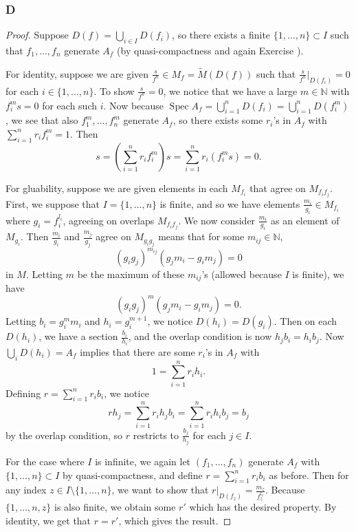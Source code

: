 \documentclass{article}
\newcommand{\N}{\mathbb{N}}
\DeclareMathOperator{\Spec}{\mathrm{Spec}}
\theoremstyle{definition} %
\begin{document}
\subsubsection{D}\label{4.1.D}
\begin{proof}
    Suppose $D(f)=\bigcup_{i\in I} D(f_i)$, so there exists a finite $\{1, \dots, n\}\subset I$ such that $f_1, \dots, f_n$ generate $A_f$ (by quasi-compactness and again Exercise  %
    ).

    For identity, suppose we are given $\frac{s}{f^n}\in M_f = \widetilde M(D(f))$ such that $\frac{s}{f^n}\vert_{D(f_i)}=0$ for each $i\in \{1, \dots, n\}$. To show $\frac{s}{f^n}=0$, we notice that we have a large $m\in \N$ with $f_i^m s =0$ for each such $i$. Now because $\Spec A_f = \bigcup_{i=1}^n D(f_i) = \bigcup_{i=1}^n D(f_i^m)$, we see that also $f_1^m, \dots, f_n^m$ generate $A_f$, so there exists some $r_i$'s in $A_f$ with $\sum_{i=1}^n r_i f_i^m =1$. Then
    \[
    s=(\sum_{i=1}^n r_i f_i^m)s = \sum_{i=1}^n r_i(f_i^m s) = 0.
    \]

    For gluability, suppose we are given elements in each $M_{f_i}$ that agree on $M_{f_i f_j}$. First, we suppose that $I=\{1, \dots, n\}$ is finite, and so we have elements $\frac{m_i}{g_i}\in M_{f_i}$ where $g_i=f_i^{l_i}$, agreeing on overlaps $M_{f_if_j}$. We now consider $\frac{m_i}{g_i}$ as an element of $M_{g_i}$. Then $\frac{m_i}{g_i}$ and $\frac{m_j}{g_j}$ agree on $M_{g_ig_j}$ means that for some $m_{ij}\in \N$,
    \[
    (g_ig_j)^{m_{ij}}(g_jm_i-g_im_j)=0
    \]
    in $M$. Letting $m$ be the maximum of these $m_{ij}$'s (allowed because $I$ is finite), we have
    \[
    (g_i g_j)^m (g_j m_i-g_i m_j)=0.
    \]
    Letting $b_i=g_i^m m_i$ and $h_i=g_i^{m+1}$, we notice $D(h_i)=D(g_i)$. Then on each $D(h_i)$, we have a section $\frac{b_i}{h_i}$, and the overlap condition is now $h_j b_i = h_i b_j$. Now $\bigcup_i D(h_i) = A_f$ implies that there are some $r_i$'s in $A_f$ with
    \[
    1=\sum_{i=1}^n r_i h_i.
    \]
    Defining $r=\sum_{i=1}^n r_i b_i$, we notice
    \[
    rh_j=\sum_{i=1}^n r_i h_j b_i = \sum_{i=1}^n r_i h_i b_j= b_j
    \]
    by the overlap condition, so $r$ restricts to $\frac{b_j}{h_j}$ for each $j\in I$.

    For the case where $I$ is infinite, we again let $(f_1, \dots, f_n)$ generate $A_f$ with $\{1, \dots, n\} \subset I$ by quasi-compactness, and define $r=\sum_{i=1}^n r_i b_i$ as before. Then for any index $z\in I\setminus \{1, \dots, n\}$, we want to show that $r\vert_{D(f_z)}=\frac{m_z}{f_z^{l_z}}$. Because $\{1, \dots, n, z\}$ is also finite, we obtain some $r'$ which has the desired property. By identity, we get that $r=r'$, which gives the result.


\end{proof}
\end{document}
